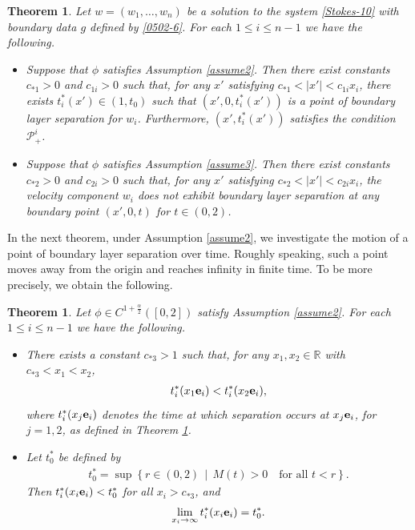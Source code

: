 \documentclass{amsart}
\newtheorem{theorem}[defn]{Theorem}
\numberwithin{equation}{section}
\newcommand {\al}{\alpha}
\begin{document}
\begin{theorem}\label{maintheorem}
Let $w = (w_1, \dots, w_n)$ be a solution to the system \eqref{Stokes-10} with boundary data $g$ defined by \eqref{0502-6}. For each $1 \leq i \leq n-1$ we have the following.
\begin{itemize}

\item[(i)]
Suppose that $\phi$ satisfies Assumption \ref{assume2}. Then there exist constants $c_{*1}>0$ and $c_{1i}>0$ such that, for any $x'$ satisfying $c_{*1}<|x'|<c_{1i}x_i$, there exists $t_i^*(x')\in(1,t_0)$ such that $(x',0,t_i^*(x'))$ is a point of boundary layer separation for $w_i$. Furthermore, $(x', t_i^*(x'))$ satisfies the condition ${\mathcal P}^i_+$.
  
\item[(ii)]
Suppose that $\phi$ satisfies Assumption \ref{assume3}. Then there exist constants $c_{*2}>0$ and $c_{2i}>0$ such that, for any $x'$ satisfying $c_{*2}<|x'|<c_{2i}x_i$, the velocity component $w_i$ does not exhibit boundary layer separation at any boundary point $(x',0,t)$ for $t\in(0,2)$.

\end{itemize}
\end{theorem}

In the next theorem, under Assumption \ref{assume2}, we investigate the motion of a point of boundary layer separation over time. Roughly speaking, such a point moves away from the origin and reaches infinity in finite time. To be  more precisely, we obtain the following.

\begin{theorem}\label{theorem1221}
Let $\phi \in C^{1 +\frac{\al}2} ([0,2])$ satisfy Assumption \ref{assume2}.  For each $1 \leq i \leq n-1$ we have the following.
\begin{itemize}
\item[(i)]
There exists a constant $c_{*3}>1$ such that, for any $x_1,x_2\in\mathbb{R}$ with $c_{*3}<x_1<x_2$,
\begin{align*}%
  t_i^*(x_1{\bf e}_i) < t_i^*(x_2{\bf e}_i),
\end{align*}
where $t_i^*(x_j{\bf e}_i)$ denotes the time at which separation occurs at $x_j{\bf e}_i$, for $j=1,2$, as defined in Theorem \ref{maintheorem}.
 
\item[(ii)]
Let $t_0^*$ be defined by
\begin{align}\label{t^*_1}
t_0^*=\sup\left\{r\in(0,2)\,\middle|\, M(t) >  0 \quad \mbox{for all } t< r \right\}.
\end{align}
Then $t_i^*(x_i{\bf e}_i)<t_0^*$ for all $x_i>c_{*3}$, and
\begin{align*}
\lim_{x_i\to\infty} t_i^*(x_i{\bf e}_i)=t_0^*.
\end{align*}
\end{itemize}
\end{theorem}
\end{document}
